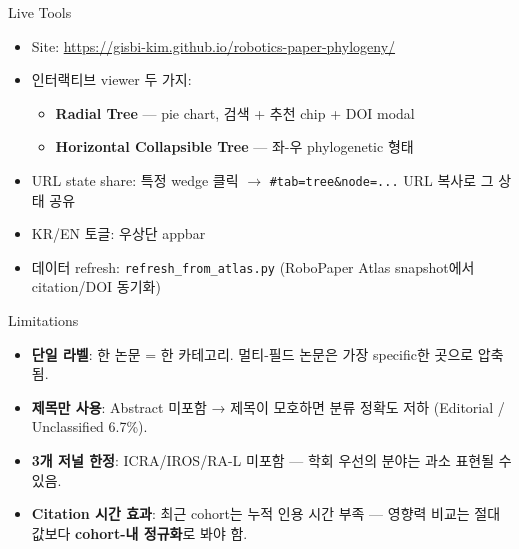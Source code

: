 \documentclass[aspectratio=169,t]{beamer}
\newcommand{\hot}[1]{\textcolor{accentorange}{\textbf{#1}}}
\newcommand{\cool}[1]{\textcolor{accentblue}{\textbf{#1}}}
\begin{document}
\begin{frame}{Live Tools}
\begin{itemize}
  \item Site: \url{https://gisbi-kim.github.io/robotics-paper-phylogeny/}
  \item 인터랙티브 viewer 두 가지:
  \begin{itemize}
    \item \cool{Radial Tree} — pie chart, 검색 + 추천 chip + DOI modal
    \item \cool{Horizontal Collapsible Tree} — 좌-우 phylogenetic 형태
  \end{itemize}
  \item URL state share: 특정 wedge 클릭 $\to$ \texttt{\#tab=tree\&node=...} URL 복사로 그 상태 공유
  \item KR/EN 토글: 우상단 appbar
  \item 데이터 refresh: \texttt{refresh\_from\_atlas.py} (RoboPaper Atlas snapshot에서 citation/DOI 동기화)
\end{itemize}
\end{frame}

\begin{frame}{Limitations}
\begin{itemize}
  \item \cool{단일 라벨}: 한 논문 = 한 카테고리. 멀티-필드 논문은 가장 specific한 곳으로 압축됨.
  \item \cool{제목만 사용}: Abstract 미포함 → 제목이 모호하면 분류 정확도 저하 (Editorial / Unclassified 6.7\%).
  \item \cool{3개 저널 한정}: ICRA/IROS/RA-L 미포함 — 학회 우선의 분야는 과소 표현될 수 있음.
  \item \cool{Citation 시간 효과}: 최근 cohort는 누적 인용 시간 부족 — 영향력 비교는 절대값보다 \hot{cohort-내 정규화}로 봐야 함.
\end{itemize}
\end{frame}
\end{document}
